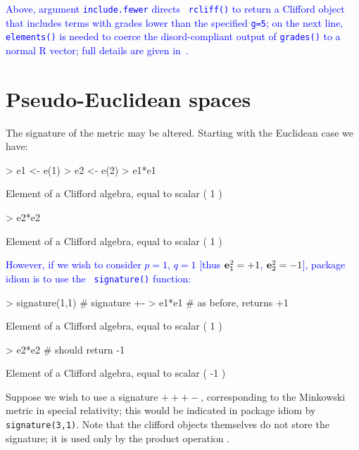 \documentclass{birkjour}
\theoremstyle{definition}
\theoremstyle{remark}
\numberwithin{equation}{section}
\begin{document}
\textcolor{blue}{Above, argument {\tt include.fewer} directs {\tt
    rcliff()} to return a Clifford object that includes terms with
  grades lower than the specified {\tt g=5}; on the next line, {\tt
    elements()} is needed to coerce the disord-compliant output of
  {\tt grades()} to a normal R vector; full details are given
  in~\cite{hankin2022_disordR}.}

\section{Pseudo-Euclidean spaces}

The signature of the metric may be altered.  Starting with the
Euclidean case we have:
    
\begin{Schunk}
\begin{Sinput}
> e1 <- e(1)
> e2 <- e(2)
> e1*e1
\end{Sinput}
\begin{Soutput}
Element of a Clifford algebra, equal to
scalar ( 1 )
\end{Soutput}
\begin{Sinput}
> e2*e2
\end{Sinput}
\begin{Soutput}
Element of a Clifford algebra, equal to
scalar ( 1 )
\end{Soutput}
\end{Schunk}

\textcolor{blue}{However, if we wish to consider $p=1$, $q=1$ [thus
    ${\bf e}_{1}^2=+1$, ${\bf e}_{2}^2=-1$], package idiom is to use the {\tt
    signature()} function:}

\begin{Schunk}
\begin{Sinput}
> signature(1,1)  # signature +-
> e1*e1 # as before, returns +1
\end{Sinput}
\begin{Soutput}
Element of a Clifford algebra, equal to
scalar ( 1 )
\end{Soutput}
\begin{Sinput}
> e2*e2 # should return -1
\end{Sinput}
\begin{Soutput}
Element of a Clifford algebra, equal to
scalar ( -1 )
\end{Soutput}
\end{Schunk}

Suppose we wish to use a signature $+++-$, corresponding to the
Minkowski metric in special relativity; this would be indicated in
package idiom by {\tt signature(3,1)}.  Note that the clifford objects
themselves do not store the signature; it is used only by the product
operation {\tt *}.
\end{document}

